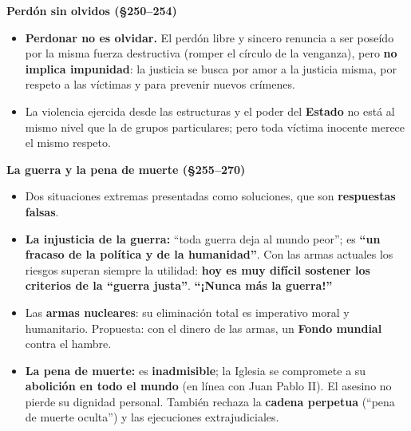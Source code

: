 \documentclass[10pt,a4paper]{article}
\begin{document}
\medskip\noindent \textbf{Perdón sin olvidos (\S{}250--254)}\par\nopagebreak
\begin{itemize}
\item \textbf{Perdonar no es olvidar.} El perdón libre y sincero renuncia a ser poseído por la misma fuerza destructiva (romper el círculo de la venganza), pero \textbf{no implica impunidad}: la justicia se busca por amor a la justicia misma, por respeto a las víctimas y para prevenir nuevos crímenes.
\item La violencia ejercida desde las estructuras y el poder del \textbf{Estado} no está al mismo nivel que la de grupos particulares; pero toda víctima inocente merece el mismo respeto.
\end{itemize}

\medskip\noindent \textbf{La guerra y la pena de muerte (\S{}255--270)}\par\nopagebreak
\begin{itemize}
\item Dos situaciones extremas presentadas como soluciones, que son \textbf{respuestas falsas}.
\item \textbf{La injusticia de la guerra:} ``toda guerra deja al mundo peor''; es \textbf{``un fracaso de la política y de la humanidad''}. Con las armas actuales los riesgos superan siempre la utilidad: \textbf{hoy es muy difícil sostener los criterios de la ``guerra justa''}. \textbf{``¡Nunca más la guerra!''}
\item Las \textbf{armas nucleares}: su eliminación total es imperativo moral y humanitario. Propuesta: con el dinero de las armas, un \textbf{Fondo mundial} contra el hambre.
\item \textbf{La pena de muerte:} es \textbf{inadmisible}; la Iglesia se compromete a su \textbf{abolición en todo el mundo} (en línea con Juan Pablo II). El asesino no pierde su dignidad personal. También rechaza la \textbf{cadena perpetua} (``pena de muerte oculta'') y las ejecuciones extrajudiciales.
\end{itemize}
\end{document}
